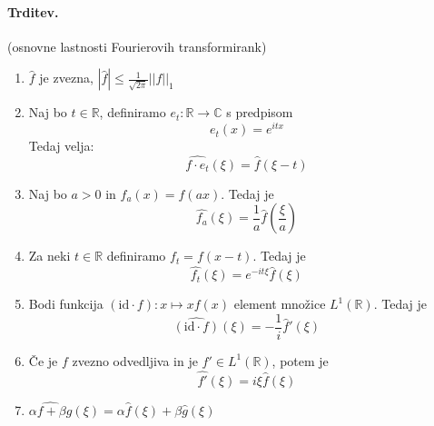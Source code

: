 \documentclass[a4paper]{article}
\newcommand{\C}{\mathbb{C}}
\newcommand{\R}{\mathbb{R}}
\newcommand{\fn}[3]{{#1}\colon {#2} \rightarrow {#3}}
\begin{document}
\paragraph{Trditev.} (osnovne lastnosti Fourierovih transformirank)
\begin{enumerate}
    \item $\hat{f}$ je zvezna, $\displaystyle{|\hat{f}| \leq \frac{1}{\sqrt{2\pi}} ||f||_1}$
    \item Naj bo $t \in \R$, definiramo $\fn{e_t}{\R}{\C}$ s predpisom $$e_t(x) = e^{itx}$$ Tedaj velja: $$\widehat{f \cdot e_t}(\xi) = \widehat{f}(\xi - t)$$
    \item Naj bo $a > 0$ in $f_a(x) = f(ax)$. Tedaj je $$\widehat{f_a}(\xi) = \frac{1}{a}\hat{f}\left(\frac{\xi}{a}\right)$$
    \item Za neki $t\in\R$ definiramo $f_t = f(x-t)$. Tedaj je $$\widehat{f_t}(\xi) = e^{-it\xi} \hat{f}(\xi)$$
    \item Bodi funkcija $(\mathrm{id} \cdot f): x \mapsto xf(x)$ element množice $L^1(\R)$. Tedaj je $$\widehat{(\mathrm{id} \cdot f)}(\xi) = -\frac{1}{i}\hat{f}'(\xi)$$
    \item Če je $f$ zvezno odvedljiva in je $f' \in L^1(\R)$, potem je $$\widehat{f'}(\xi) = i\xi\hat{f}(\xi)$$
    \item $\displaystyle{\widehat{\alpha f + \beta g}(\xi) = \alpha \hat{f}(\xi) + \beta \hat{g}(\xi)}$
\end{enumerate}
\end{document}
